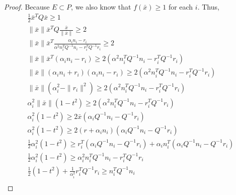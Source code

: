 \begin{proof}
Because $E \subset P$, we also know that $f(\bar x) \ge 1$ for each $i$. Thus,
\begin{align*}
\frac 1 2 \bar x^{T} Q \bar x \ge 1 \\
\|\bar x \|\bar x^{T} Q \frac{\bar x}{\|\bar x\|} \ge 2 \\
\|\bar x\| \bar x^{T} \frac{\alpha_i n_i - r_i}{\alpha^2 n_i^TQ^{-1} n_i - r_i^T Q^{-1}r_i}\ge 2 \\
\|\bar x\| \bar x^{T} (\alpha_i n_i - r_i)\ge 2\left(\alpha^2 n_i^TQ^{-1} n_i - r_i^T Q^{-1}r_i \right)\\
\|\bar x\| (\alpha_i n_i + r_i) (\alpha_i n_i - r_i)\ge 2\left(\alpha^2 n_i^TQ^{-1} n_i - r_i^T Q^{-1}r_i\right) \\
\|\bar x\| (\alpha_i^2 - \|r_i\|^2)\ge 2\left(\alpha^2 n_i^TQ^{-1} n_i - r_i^T Q^{-1}r_i\right) \\
\alpha_i^2 \|\bar x\| (1 - t^2)\ge 2\left(\alpha^2 n_i^TQ^{-1} n_i - r_i^T Q^{-1}r_i\right) \\
\alpha_i^2 (1 - t^2)\ge 2\bar x(\alpha_i Q^{-1} n_i - Q^{-1}r_i) \\
\alpha_i^2 (1 - t^2)\ge 2(r + \alpha_i n_i)(\alpha_i Q^{-1} n_i - Q^{-1}r_i) \\
\frac 1 2 \alpha_i^2 (1 - t^2)\ge r_i^T(\alpha_i Q^{-1} n_i - Q^{-1}r_i) + \alpha_i n_i^T(\alpha_i Q^{-1} n_i - Q^{-1}r_i)  \\
\frac 1 2 \alpha_i^2 (1 - t^2)\ge \alpha_i^2 n_i^T Q^{-1} n_i - r_i^TQ^{-1}r_i \\
\frac 1 2 (1 - t^2) + \frac{1}{\alpha_i^2}r_i^TQ^{-1}r_i \ge n_i^T Q^{-1} n_i \\
\end{align*}

\end{proof}

